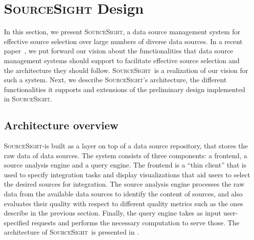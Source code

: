 \documentclass{vldb}
\newcommand\system{\textsc{SourceSight}}
\begin{document}
%
%
%
%
%
%
%
%
%
%

\section{{\Large \system} Design}
In this section, we present \system, a data source management system for effective source selection over large numbers of diverse data sources. In a recent paper~\cite{rekatsinas:2015}, we put forward our vision about the functionalities that data source management systems should support to facilitate effective source selection and the architecture they should follow. 
\system~is a realization of our vision for such a system. Next, we describe \system's architecture, the different functionalities it supports and extensions of the preliminary design implemented in \system.%

\subsection{Architecture overview}
\system-is built as a layer on top of a data source repository, that stores the raw data of data sources. The system consists of three components: a frontend, a source analysis engine and a query engine. The frontend is a ``thin client'' that is used to specify integration tasks and display visualizations that aid users to select the desired sources for integration. The source analysis engine processes the raw data from the available data sources to identify the content of sources, and also evaluates their quality with respect to different quality metrics such as the ones describe in the previous section. Finally, the query engine takes as input user-specified requests and performs the necessary computation to serve those. The architecture of \system~is presented in . 
\end{document}
